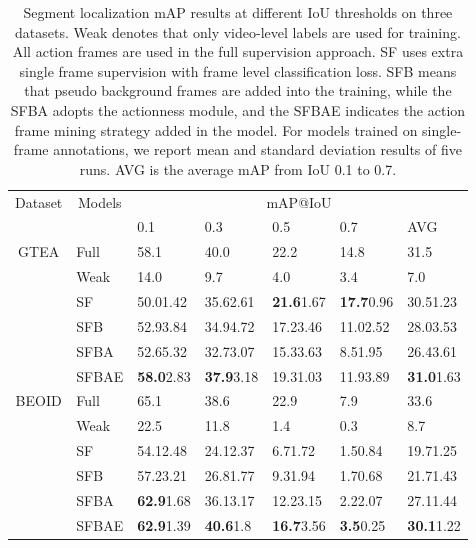 \documentclass[runningheads]{llncs}
\begin{document}
	
	\begin{table}[!ht]
		\centering
\caption{Segment localization mAP results at different IoU thresholds on three datasets. Weak denotes that only video-level labels are used for training. All action frames are used in the full supervision approach. SF uses extra single frame supervision with frame level classification loss. SFB means that pseudo background frames are added into the training, while the SFBA adopts the actionness module, and the SFBAE indicates the action frame mining strategy added in the model. For models trained on single-frame annotations, we report mean and standard deviation results of five runs.  AVG is the average mAP from IoU 0.1 to 0.7.}
		
		\setlength\extrarowheight{1pt}
\begin{tabular}{c|l|p{1.7cm}p{1.7cm}p{1.7cm}p{1.7cm}p{1.7cm}}
			\hline
			\multicolumn{1}{c|}{\multirow{2}{*}{Dataset}}  &\multicolumn{1}{c|}{\multirow{2}{*}{Models}}     & \multicolumn{5}{c}{mAP@IoU}      \\ \cline{3-7}
			\multicolumn{1}{c|}{} & \multicolumn{1}{c|}{}         &  0.1  & 0.3 & 0.5 & 0.7 & AVG \\   \hline \hline
			\multirow{6}{*}{GTEA} 
			&Full & 58.1 & 40.0 & 22.2 & 14.8 & 31.5 \\ 
			&Weak  & 14.0 & 9.7 & 4.0 & 3.4 & 7.0 \\ \cline{2-7}
			&SF & 50.01.42 & 35.62.61 & \textbf{21.6}1.67 & \textbf{17.7}0.96 & 30.51.23 \\ 
			&SFB & 52.93.84 & 34.94.72 & 17.23.46 & 11.02.52 & 28.03.53 \\ 
			&SFBA & 52.65.32 & 32.73.07 & 15.33.63 & 8.51.95 & 26.43.61 \\ 
			&SFBAE & \textbf{58.0}2.83 & \textbf{37.9}3.18 & 19.31.03 & 11.93.89 & \textbf{31.0}1.63 \\ \hline
			\multirow{6}{*}{BEOID} 
			&Full & 65.1 & 38.6 & 22.9 & 7.9 & 33.6 \\ 
			&Weak & 22.5 & 11.8 & 1.4 & 0.3 & 8.7 \\ \cline{2-7}
			&SF & 54.12.48 & 24.12.37 & 6.71.72 & 1.50.84 & 19.71.25 \\ 
			&SFB & 57.23.21 & 26.81.77 & 9.31.94 & 1.70.68 & 21.71.43 \\ 
			&SFBA & \textbf{62.9}1.68 & 36.13.17 & 12.23.15 & 2.22.07 & 27.11.44 \\ 
			&SFBAE & \textbf{62.9}1.39 & \textbf{40.6}1.8 & \textbf{16.7}3.56 & \textbf{3.5}0.25 & \textbf{30.1}1.22 \\ \hline
			

\end{tabular}
\end{table}
\end{document}
